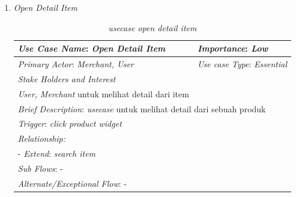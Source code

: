\documentclass[a4paper]{article}
\begin{document}
\begin{enumerate}
\begin{enumerate}
        \item \textit{Open Detail Item}
        \begin{table}[h]
            \centering
            \begin{tabular}{|lll}
            \hline
            \multicolumn{1}{|l|}{\textit{Use Case Name}: \textit{Open Detail Item}}             & \multicolumn{2}{l|}{\textit{Importance}: \textit{Low}}   \\ \hline
            \multicolumn{1}{|l|}{\textit{Primary Actor}: \textit{Merchant, User}}             & \multicolumn{2}{l|}{\textit{Use case Type}: \textit{Essential}} \\ \hline
            \multicolumn{1}{|l|}{\textit{Stake Holders and Interest}} &                               &                               \\ \cline{1-1}
            \multicolumn{1}{|l|}{\textit{User, Merchant} untuk melihat detail dari item}                                                     &                               &                               \\ \hline
            \multicolumn{3}{|l|}{\textit{Brief Description}: \textit{usecase} untuk melihat detail dari sebuah produk}                                                                         \\ \hline
            \multicolumn{3}{|l|}{\textit{Trigger}: \textit{click product widget} }                                                                                   \\ \hline
            \multicolumn{3}{|l|}{\textit{Relationship:}}                                                                              \\ \hline
            \multicolumn{3}{|l|}{- \textit{Extend}: \textit{search item}}                                                                                                                     \\ \hline
            \multicolumn{3}{|l|}{\textit{Sub Flows}: -}                                                                                 \\ \hline
            \multicolumn{3}{|l|}{\textit{Alternate/Exceptional Flow}: -}                                                                \\ \hline
            \end{tabular}
            \caption{\textit{usecase open detail item}}
        \end{table}


\end{enumerate}
\end{enumerate}
\end{document}
